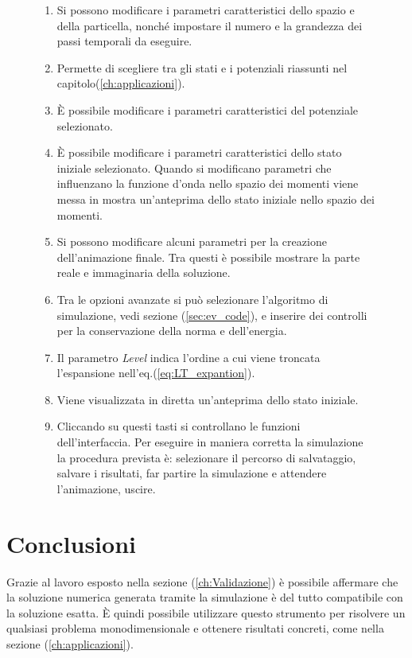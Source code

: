 \documentclass[12pt]{report}
\begin{document}
\begin{figure}
{    \begin{enumerate}[nolistsep]
        \item Si possono modificare i parametri caratteristici dello spazio e della particella, nonché impostare il numero e la grandezza dei passi temporali da eseguire.
        \item Permette di scegliere tra gli stati e i potenziali riassunti nel capitolo(\ref{ch:applicazioni}).
        \item È possibile modificare i parametri caratteristici del potenziale selezionato.
        \item È possibile modificare i parametri caratteristici dello stato iniziale selezionato. Quando si modificano parametri che influenzano la funzione d'onda nello spazio dei momenti viene messa in mostra un'anteprima dello stato iniziale nello spazio dei momenti. 
        \item  Si possono modificare alcuni parametri per la creazione dell'animazione finale. Tra questi è possibile mostrare la parte reale e immaginaria della soluzione.
        \item Tra le opzioni avanzate si può selezionare l'algoritmo di simulazione, vedi sezione (\ref{sec:ev_code}), e inserire dei controlli per la conservazione della norma e dell'energia.
        \item Il parametro  \textsl{Level} indica l'ordine a cui viene troncata l'espansione nell'eq.(\ref{eq:LT_expantion}).
        \item Viene visualizzata in diretta un'anteprima dello stato iniziale.
        \item Cliccando su questi tasti si controllano le funzioni dell'interfaccia. Per eseguire in maniera corretta la simulazione la procedura prevista è: selezionare il percorso di salvataggio, salvare i risultati, far partire la simulazione e attendere l'animazione, uscire.    
    \end{enumerate}
    }
    \label{fig:interface}
\end{figure}

\clearpage


\chapter*{Conclusioni}
\label{ch:conclusioni}

Grazie al lavoro esposto nella sezione (\ref{ch:Validazione}) è possibile affermare che la soluzione numerica
generata tramite la simulazione è  del tutto compatibile con la soluzione esatta. 
È quindi possibile utilizzare questo strumento per risolvere un qualsiasi problema monodimensionale e ottenere risultati concreti, come nella sezione (\ref{ch:applicazioni}). 
\end{document}
